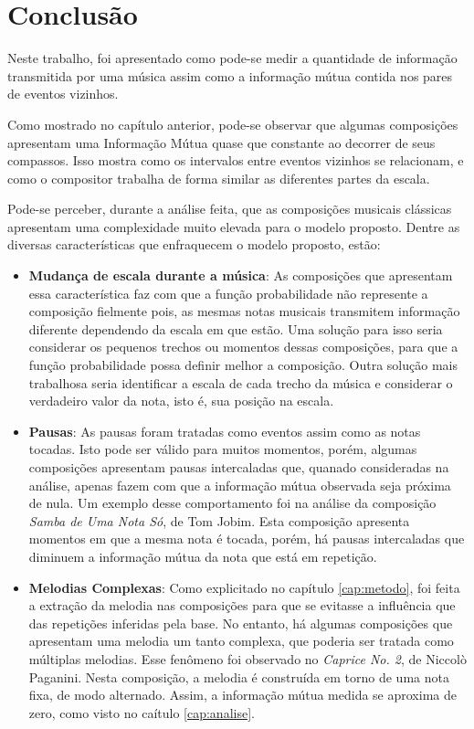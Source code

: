 \section{Conclusão}

Neste trabalho, foi apresentado como pode-se medir a quantidade de informação transmitida por uma música assim como a informação mútua contida nos pares de eventos vizinhos.

Como mostrado no capítulo anterior, pode-se observar que algumas composições apresentam uma Informação Mútua quase que constante ao decorrer de seus compassos. Isso mostra como os intervalos entre eventos vizinhos se relacionam, e como o compositor trabalha de forma similar as diferentes partes da escala.

Pode-se perceber, durante a análise feita, que as composições musicais clássicas apresentam uma complexidade muito elevada para o modelo proposto. Dentre as diversas características que enfraquecem o modelo proposto, estão:

\begin{itemize}
    \item \textbf{Mudança de escala durante a música}: As composições que apresentam essa característica faz com que a função probabilidade não represente a composição fielmente pois, as mesmas notas musicais transmitem informação diferente dependendo da escala em que estão. Uma solução para isso seria considerar os pequenos trechos ou momentos dessas composições, para que a função probabilidade possa definir melhor a composição. Outra solução mais trabalhosa seria identificar a escala de cada trecho da música e considerar o verdadeiro valor da nota, isto é, sua posição na escala.
    \item \textbf{Pausas}: As pausas foram tratadas como eventos assim como as notas tocadas. Isto pode ser válido para muitos momentos, porém, algumas composições apresentam pausas intercaladas que, quanado consideradas na análise, apenas fazem com que a informação mútua observada seja próxima de nula. Um exemplo desse comportamento foi na análise da composição \textit{Samba de Uma Nota Só}, de Tom Jobim. Esta composição apresenta momentos em que a mesma nota é tocada, porém, há pausas intercaladas que diminuem a informação mútua da nota que está em repetição.
    \item \textbf{Melodias Complexas}: Como explicitado no capítulo \ref{cap:metodo}, foi feita a extração da melodia nas composições para que se evitasse a influência que das repetições inferidas pela base. No entanto, há algumas composições que apresentam uma melodia um tanto complexa, que poderia ser tratada como múltiplas melodias. Esse fenômeno foi observado no \textit{Caprice No. 2}, de Niccolò Paganini. Nesta composição, a melodia é construída em torno de uma nota fixa, de modo alternado. Assim, a informação mútua medida se aproxima de zero, como visto no caítulo \ref{cap:analise}.
\end{itemize}

